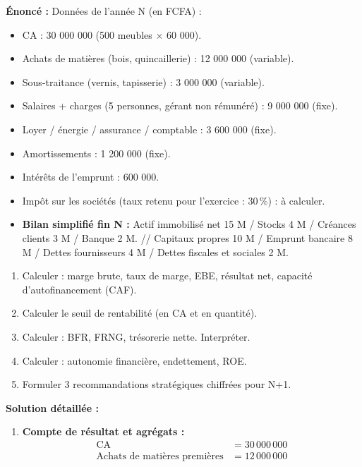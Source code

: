 \documentclass[11pt]{article}
\newcommand{\cle}[1]{{\popxbold\color{popdark}#1}}
\begin{document}
\begin{exoresolu}
    \textbf{Énoncé :} Données de l'année N (en FCFA) :
    \begin{itemize}
        \item CA : 30 000 000 (500 meubles $\times$ 60 000).
        \item Achats de matières (bois, quincaillerie) : 12 000 000 (variable).
        \item Sous-traitance (vernis, tapisserie) : 3 000 000 (variable).
        \item Salaires + charges (5 personnes, gérant non rémunéré) : 9 000 000 (fixe).
        \item Loyer / énergie / assurance / comptable : 3 600 000 (fixe).
        \item Amortissements : 1 200 000 (fixe).
        \item Intérêts de l'emprunt : 600 000.
        \item Impôt sur les sociétés (taux retenu pour l'exercice : 30\,\%) : à calculer.
        \item \textbf{Bilan simplifié fin N :} Actif immobilisé net 15 M / Stocks 4 M / Créances clients 3 M / Banque 2 M. // Capitaux propres 10 M / Emprunt bancaire 8 M / Dettes fournisseurs 4 M / Dettes fiscales et sociales 2 M.
    \end{itemize}
    \begin{enumerate}
        \item Calculer : marge brute, taux de marge, EBE, résultat net, capacité d'autofinancement (CAF).
        \item Calculer le \cle{seuil de rentabilité} (en CA et en quantité).
        \item Calculer : BFR, FRNG, trésorerie nette. Interpréter.
        \item Calculer : autonomie financière, endettement, ROE.
        \item Formuler 3 recommandations stratégiques chiffrées pour N+1.
    \end{enumerate}
    \tcblower
    \textbf{Solution détaillée :}
    \begin{enumerate}
        \item \textbf{Compte de résultat et agrégats :}
              \begin{align*}
                  \text{CA} &= 30\,000\,000 \\
                  \text{Achats de matières premières} &= 12\,000\,000 \\

\end{align*}
\end{enumerate}
\end{exoresolu}
\end{document}

